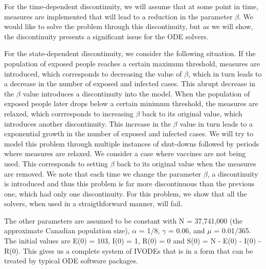 For the time-dependent discontinuity, we will assume that at some point in time, measures are implemented that will lead to a reduction in the parameter $\beta$. We would like to solve the problem through this discontinuity, but as we will show, the discontinuity presents a significant issue for the ODE solvers.

For the state-dependent discontinuity, we consider the following situation. If the population of exposed people reaches a certain maximum threshold, measures are introduced, which corresponds to decreasing the value of $\beta$, which in turn leads to a decrease in the number of exposed and infected cases. This abrupt decrease in the $\beta$ value introduces a discontinuity into the model. When the population of exposed people later drops below a certain minimum threshold, the measures are relaxed, which corrresponds to increasing $\beta$ back to its original value, which introduces another discontinuity. This increase in the $\beta$ value in turn leads to a exponential growth in the number of exposed and infected cases. We will try to model this problem through multiple instances of shut-downs followed by periods where measures are relaxed. We consider a case where vaccines are not being used. This corresponds to setting $\beta$ back to its original value when the measures are removed. We note that each time we change the parameter $\beta$, a discontinuity is introduced and thus this problem is far more discontinuous than the previous one, which had only one discontinuity. For this problem, we show that all the solvers, when used in a straigthforward manner, will fail.

The other parameters are assumed to be constant with N = 37,741,000 (the approximate Canadian population size), $\alpha$ = 1/8, $\gamma$ = 0.06, and $\mu$ = 0.01/365. The initial values are E(0) = 103, I(0) = 1, R(0) = 0 and S(0) = N - E(0) - I(0) - R(0). This gives us a complete system of IVODEs that is in a form that can be treated by typical ODE software packages.

